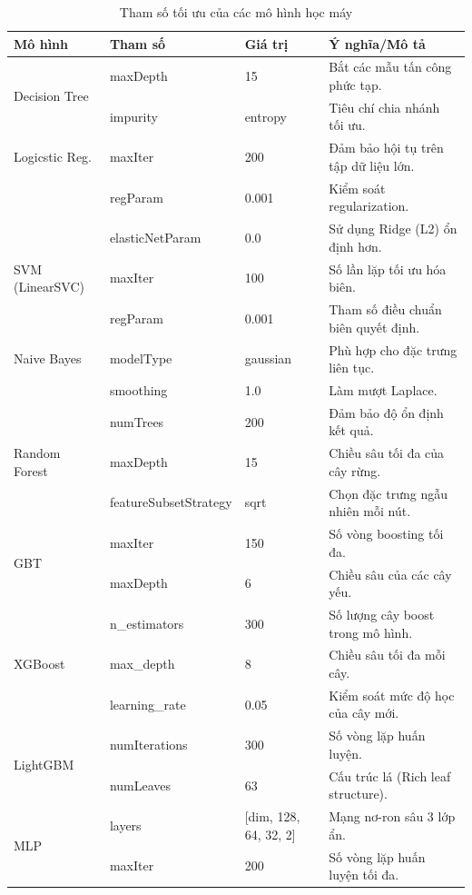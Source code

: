 \begin{table}[htbp]
\centering
\caption{Tham số tối ưu của các mô hình học máy}
\label{tab:model_parameters}
\small
\renewcommand{\arraystretch}{0.9}
\begin{tabular*}{\textwidth}{@{\extracolsep{\fill}}llp{2.5cm}p{6cm}@{}}
\toprule
\textbf{Mô hình} & \textbf{Tham số} & \textbf{Giá trị} & \textbf{Ý nghĩa/Mô tả} \\
\midrule
\multirow{2}{*}{Decision Tree} 
& maxDepth & 15 & Bắt các mẫu tấn công phức tạp. \\
& impurity & entropy & Tiêu chí chia nhánh tối ưu. \\
\midrule
Logicstic Reg. & maxIter & 200 & Đảm bảo hội tụ trên tập dữ liệu lớn. \\
& regParam & 0.001 & Kiểm soát regularization. \\
& elasticNetParam & 0.0 & Sử dụng Ridge (L2) ổn định hơn. \\
\midrule
SVM (LinearSVC) & maxIter & 100 & Số lần lặp tối ưu hóa biên. \\
& regParam & 0.001 & Tham số điều chuẩn biên quyết định. \\
\midrule
Naive Bayes & modelType & gaussian & Phù hợp cho đặc trưng liên tục. \\
& smoothing & 1.0 & Làm mượt Laplace. \\
\midrule
\multirow{3}{*}{Random Forest} 
& numTrees & 200 & Đảm bảo độ ổn định kết quả. \\
& maxDepth & 15 & Chiều sâu tối đa của cây rừng. \\
& featureSubsetStrategy & sqrt & Chọn đặc trưng ngẫu nhiên mỗi nút. \\
\midrule
\multirow{2}{*}{GBT} 
& maxIter & 150 & Số vòng boosting tối đa. \\
& maxDepth & 6 & Chiều sâu của các cây yếu. \\
\midrule
\multirow{3}{*}{XGBoost} 
& n\_estimators & 300 & Số lượng cây boost trong mô hình. \\
& max\_depth & 8 & Chiều sâu tối đa mỗi cây. \\
& learning\_rate & 0.05 & Kiểm soát mức độ học của cây mới. \\
\midrule
\multirow{2}{*}{LightGBM} 
& numIterations & 300 & Số vòng lặp huấn luyện. \\
& numLeaves & 63 & Cấu trúc lá (Rich leaf structure). \\
\midrule
\multirow{2}{*}{MLP} 
& layers & [dim, 128, 64, 32, 2] & Mạng nơ-ron sâu 3 lớp ẩn. \\
& maxIter & 200 & Số vòng lặp huấn luyện tối đa. \\
\bottomrule
\end{tabular*}
\end{table}

